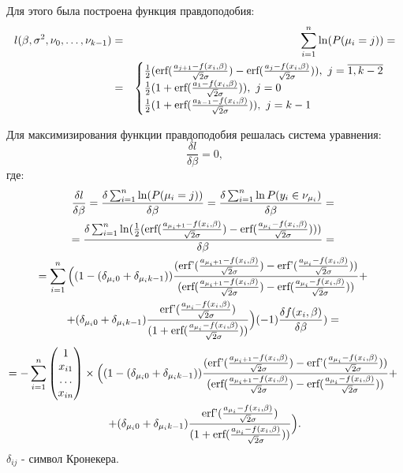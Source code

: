 Для этого была построена функция правдоподобия:
\begin{eqnarray}
    \label{eq22}\label{eq23}l(\beta,\sigma^2, \nu_0,\dots, \nu_{k-1})&=&\sum_{i=1}^{n}\ln(P(\mu_i=j))=\\
    &=&\begin{cases}
        \frac{1}{2}(\textup{erf}(\frac{a_{j+1}-f(x_i,\beta)}{\sqrt{2}\sigma})-\textup{erf}(\frac{a_{j}-f(x_i,\beta)}{\sqrt{2}\sigma})),~j=\overline{1,k-2}\\
        \frac{1}{2}(1+\textup{erf}(\frac{a_{1}-f(x_i,\beta)}{\sqrt{2}\sigma})),~j=0\\
        \frac{1}{2}(1+\textup{erf}(\frac{a_{k-1}-f(x_i,\beta)}{\sqrt{2}\sigma})),~j=k-1
    \end{cases}
\end{eqnarray}

Для максимизирования функции правдоподобия решалась система уравнения:
\begin{equation}
    \label{eq24}\frac{\delta l}{\delta \beta}=0,
\end{equation}
где:
\begin{multline}
    \label{eq27}\frac{\delta l}{\delta \beta}=\frac{\delta \sum_{i=1}^{n}\ln(P(\mu_i=j))}{\delta \beta}=\frac{\delta \sum_{i=1}^{n}\ln P(y_i\in \nu_{\mu_i})}{\delta \beta}=~\\
    =\frac{\delta \sum_{i=1}^{n} \ln(\frac{1}{2}(\textup{erf}(\frac{a_{\mu_i+1}-f(x_i,\beta)}{\sqrt{2}\sigma})-\textup{erf}(\frac{a_{\mu_i}-f(x_i,\beta)}{\sqrt{2}\sigma})) )         }{\delta \beta}=~\\
    =  \sum_{i=1}^{n}\Big((1-(\delta_{\mu_i 0}+\delta_{\mu_i k-1}))\frac{(\textup{erf'}(\frac{a_{\mu_i+1}-f(x_i,\beta)}{\sqrt{2}\sigma})-\textup{erf'}(\frac{a_{\mu_i}-f(x_i,\beta)}{\sqrt{2}\sigma}))}{ (\textup{erf}(\frac{a_{\mu_i+1}-f(x_i,\beta)}{\sqrt{2}\sigma})-\textup{erf}(\frac{a_{\mu_i}-f(x_i,\beta)}{\sqrt{2}\sigma}))}+~\\
    +(\delta_{\mu_i 0}+\delta_{\mu_i k-1})\frac{\textup{erf'}(\frac{a_{\mu_i}-f(x_i,\beta)}{\sqrt{2}\sigma})}{(1+\textup{erf}(\frac{a_{\mu_i}-f(x_i,\beta)}{\sqrt{2}\sigma}))}\Big)  (-1) \frac{\delta f(x_i,\beta)}{\delta \beta} )=~
\end{multline}
\begin{multline}
    \nonumber 
    =-\sum_{i=1}^{n}\begin{pmatrix}
        1\\
        x_{i1}\\
        \dots\\
        x_{in}
    \end{pmatrix}\times  \Big((1-(\delta_{\mu_i 0}+\delta_{\mu_i k-1}))\frac{(\textup{erf'}(\frac{a_{\mu_i+1}-f(x_i,\beta)}{\sqrt{2}\sigma})-\textup{erf'}(\frac{a_{\mu_i}-f(x_i,\beta)}{\sqrt{2}\sigma}))}{ (\textup{erf}(\frac{a_{\mu_i+1}-f(x_i,\beta)}{\sqrt{2}\sigma})-\textup{erf}(\frac{a_{\mu_i}-f(x_i,\beta)}{\sqrt{2}\sigma}))}+~\\
    +(\delta_{\mu_i 0}+\delta_{\mu_i k-1})\frac{\textup{erf'}(\frac{a_{\mu_i}-f(x_i,\beta)}{\sqrt{2}\sigma})}{(1+\textup{erf}(\frac{a_{\mu_i}-f(x_i,\beta)}{\sqrt{2}\sigma}))}\Big) .
\end{multline}
$\delta_{ij}$ - символ Кронекера.

